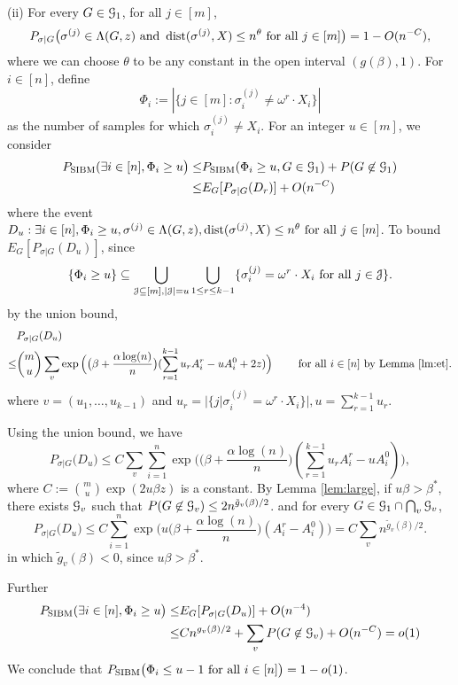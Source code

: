 \documentclass{article}
\begin{document}
\noindent (ii) For every $G\in\mathcal{G}_{1}$, for all $j\in[m]$,
\begin{equation}  \label{eq:chui}
P_{\sigma|G} \big( \sigma^{(j)}\in  \Lambda(G, z)
\text{~and~} \operatorname{dist}(\sigma^{(j)}, X) \le n^\theta
\text{~for all~} j\in[m]  \big)
=1- O(n^{-C}) ,
\end{equation}
where we can choose $\theta$ to be any constant in the open interval $(g(\beta), 1)$.
For $i\in[n]$, define 
$$
\Phi_i := |\{j\in[m]: \sigma_i^{(j)} \neq \omega^r \cdot X_i\}|
$$
as the number of samples for which $\sigma_i^{(j)} \neq X_i$.
For an integer $u\in[m]$, we consider
\begin{align*}
P_{\operatorname{SIBM}}( \exists i \in [n], \Phi_i \ge u \big) \leq &P_{\operatorname{SIBM}}( \Phi_i \ge u , G \in \mathcal{G}_{1}) + P(G \not\in \mathcal{G}_{1}) \\
\leq & E_G[P_{\sigma |G}(D_r)]+ O(n^{-C})
\end{align*}
where the event $D_u: \exists i \in [n], \Phi_i \ge u, \sigma^{(j)}\in \Lambda(G,z) ,\operatorname{dist}(\sigma^{(j)}, X) \le n^{\theta} \text{~for all~} j\in[m]$.
To bound  $E_G[P_{\sigma |G}(D_u)]$,
since
$$
\{\Phi_i \ge u\} \subseteq
\bigcup_{\mathcal{J}\subseteq[m], |\mathcal{J}|=u}\bigcup_{1\leq r \leq k-1}
\{\sigma_i^{(j)} = \omega^r \cdot X_i \text{~for all~} j\in \mathcal{J}\} .
$$
by the union bound,
\begin{align*}
& P_{\sigma|G}(D_u) \\
\le &  \binom{m}{u}\sum_v \exp\Big(\big(\beta+\frac{\alpha\log(n)}{n} \big) (\sum_{r=1}^{k-1} u_r A^r_i- u A^0_i + 2z) \Big)
\quad\quad\text{~for all~} i\in[n] \textrm{ by Lemma~\ref{lm:et}}.
\end{align*}
where $v=(u_1, \dots, u_{k-1})$ and $u_r = |\{j | \sigma_i^{(j)} = \omega^r \cdot X_i \}|, u=\sum_{r=1}^{k-1} u_r$.

Using the union bound, we have
$$
P_{\sigma|G} \big(D_u\big) \le 
C  \sum_{v}\sum_{i=1}^n \exp\Big(\big(\beta+\frac{\alpha\log(n)}{n} \big) (\sum_{r=1}^{k-1} u_r A^r_i- u A^0_i ) \Big),
$$
where $C:=\binom{m}{u}\exp(2u\beta z)$ is a constant.
By Lemma \ref{lem:large}, if $u\beta>\beta^*$, there exists $\mathcal{G}_v$ such that $P(G\not\in\mathcal{G}_v) \leq 2n^{\tilde{g}_v(\beta)/2}$.
and for every $G\in\mathcal{G}_1 \cap \bigcap_{v}\mathcal{G}_{v}$,
$$
P_{\sigma|G} \big(D_u\big) \le 
C\sum_{i=1}^n \exp\Big(u \big(\beta+\frac{\alpha\log(n)}{n} \big) (A^r_i-A^0_i ) \Big) = C\sum_{v} n^{\tilde{g}_v(\beta)/2}.
$$
in which $\tilde{g}_v(\beta) < 0$, since $u\beta > \beta^*$.

Further
\begin{align*}
P_{\operatorname{SIBM}}( \exists i \in [n], \Phi_i \ge u \big)
\leq & E_G[P_{\sigma |G}(D_u)] + O(n^{-4}) \\
\leq &  Cn^{g_v(\beta)/2} + \sum_{v} P(G \not\in \mathcal{G}_v) + O(n^{-C}) = o(1)
\end{align*}
We conclude that $P_{\operatorname{SIBM}} \big(\Phi_i \le u-1 \text{~for all~} i\in[n] \big)=1-o(1)$.
\end{document}
